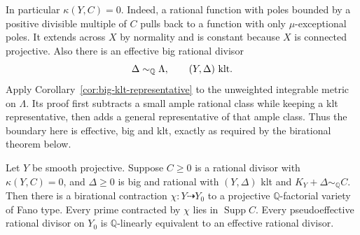 In particular $\kappa(Y,C)=0$.  Indeed, a rational function with
poles bounded by a positive divisible multiple of $C$ pulls back
to a function with only $\mu$-exceptional poles.  It extends across
$X$ by normality and is constant because $X$ is connected projective.
Also there is an effective big rational divisor
\begin{equation}\label{fano:klt-representative}
 \Delta\sim_{\mathbb Q}\Lambda,
 \qquad (Y,\Delta)\ \hbox{klt}.
\end{equation}
Apply Corollary~\ref{cor:big-klt-representative} to the unweighted
integrable metric on $\Lambda$.  Its proof first subtracts a small
ample rational class while keeping a klt representative, then adds
a general representative of that ample class.  Thus the boundary
here is effective, big and klt, exactly as required by the birational
theorem below.

\begin{theorem}\label{fano:model}
Let $Y$ be smooth projective.  Suppose $C\geq0$ is a rational divisor
with $\kappa(Y,C)=0$, and $\Delta\geq0$ is big and rational with
$(Y,\Delta)$ klt and $K_Y+\Delta\sim_{\mathbb Q}C$.  Then there is
a birational contraction $\chi:Y\dashrightarrow Y_0$ to a projective
$\mathbb Q$-factorial variety of Fano type.  Every prime contracted
by $\chi$ lies in $\operatorname{Supp}C$.  Every pseudoeffective
rational divisor on $Y_0$ is $\mathbb Q$-linearly equivalent to an
effective rational divisor.
\end{theorem}

